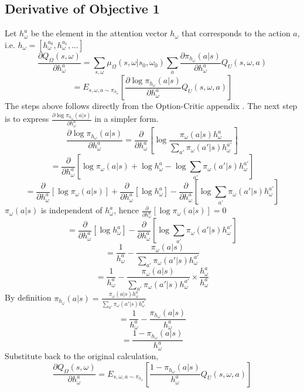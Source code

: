 \documentclass{article}
\begin{document}
	\subsection{Derivative of Objective 1}
	Let $h_\omega^a$ be the element in the attention vector $h_\omega$ that corresponds to the action $a$, i.e. $h_\omega = [h_\omega^{a_0}, h_\omega^{a_1}, ...]$
	$$\frac{\partial Q_\Omega(s,\omega)}{\partial h_\omega^a} = \sum_{s,\omega} \mu_\Omega(s,\omega|s_0, \omega_0)\sum_a \frac{\partial \pi_{h_\omega} (a|s)}{\partial h_\omega^a} Q_U(s,\omega,a)$$
	$$= E_{s,\omega,a \sim \pi_{h_\omega}}[\frac{\partial \log \pi_{h_\omega}(a|s)}{\partial h_\omega^a}Q_U(s,\omega,a)]$$
	The steps above follows directly from the Option-Critic appendix \cite{bacon2016optioncritic}. The next step is to express $\frac{\partial \log \pi_{h_\omega} (a|s)}{\partial h_\omega^a}$ in a simpler form.
	$$\frac{\partial \log \pi_{h_\omega} (a|s)}{\partial h_\omega^a} = \frac{\partial}{\partial h_\omega^a} [\log\frac{\pi_\omega(a|s)h_\omega^a}{\sum_{a'} \pi_\omega(a'|s)h_\omega^{a'}}]$$
	$$=\frac{\partial}{\partial h_\omega^a} [\log\pi_\omega(a|s) + \log h_\omega^a - \log\sum_{a'}\pi_\omega(a'|s)h_\omega^{a'}]$$
	$$=\frac{\partial}{\partial h_\omega^a} [\log\pi_\omega(a|s)] + \frac{\partial}{\partial h_\omega^a}[\log h_\omega^a] - \frac{\partial}{\partial h_\omega^a}[\log\sum_{a'}\pi_\omega(a'|s)h_\omega^{a'}]$$
	$\pi_\omega(a|s)$ is independent of $h_\omega^a$, hence $\frac{\partial}{\partial h_\omega^a} [\log\pi_\omega(a|s)]=0$
	$$= \frac{\partial}{\partial h_\omega^a}[\log h_\omega^a] - \frac{\partial}{\partial h_\omega^a}[\log\sum_{a'}\pi_\omega(a'|s)h_\omega^{a'}]$$
	$$= \frac{1}{h_\omega^a} - \frac{\pi_\omega(a|s)}{\sum_{a'}\pi_\omega(a'|s)h_\omega^{a'}}$$
	$$= \frac{1}{h_\omega^a} - \frac{\pi_\omega(a|s)}{\sum_{a'}\pi_\omega(a'|s)h_\omega^{a'}} \times \frac{h_\omega^a}{h_\omega^a}$$
	By definition $\pi_{h_\omega}(a|s)=\frac{\pi_\omega(a|s)h_\omega^a}{\sum_{a'} \pi_\omega(a'|s)h_\omega^{a'}}$
	$$= \frac{1}{h_\omega^a} - \frac{\pi_{h_\omega}(a|s)}{h_\omega^a}$$
	$$= \frac{1-\pi_{h_\omega}(a|s)}{h_\omega^a}$$
	Substitute back to the original calculation,
	$$\frac{\partial Q_\Omega(s,\omega)}{\partial h_\omega^a} = E_{s,\omega,a \sim \pi_{h_\omega}}[\frac{1-\pi_{h_\omega}(a|s)}{h_\omega^a}Q_U(s,\omega,a)]$$
\end{document}

